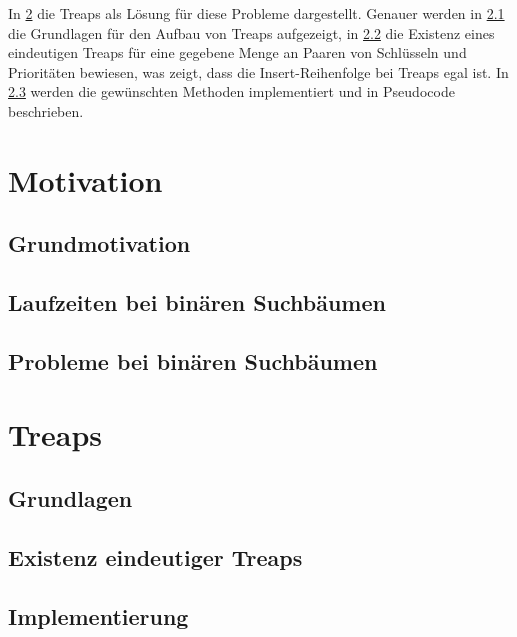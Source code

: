 \documentclass[a4paper]{scrreprt}
\theoremstyle{definition}
\begin{document}
In \ref{sec:treaps} die Treaps als Lösung für diese Probleme dargestellt. Genauer werden in \ref{sec:treapsbasics} die Grundlagen für den Aufbau von Treaps aufgezeigt, in \ref{sec:uniquetreaps} die Existenz eines eindeutigen Treaps für eine gegebene Menge an Paaren von Schlüsseln und Prioritäten bewiesen, was zeigt, dass die Insert-Reihenfolge bei Treaps egal ist. In \ref{sec:implementing} werden die gewünschten Methoden implementiert und in Pseudocode beschrieben.


\chapter{Motivation}
\label{sec:motivation}

\section{Grundmotivation}
\label{sec:motivationbasics}

\section{Laufzeiten bei binären Suchbäumen}
\label{sec:binaryruntime}

\section{Probleme bei binären Suchbäumen}
\label{sec:binaryproblems}

\chapter{Treaps}
\label{sec:treaps}

\section{Grundlagen}
\label{sec:treapsbasics}

\section{Existenz eindeutiger Treaps}
\label{sec:uniquetreaps}

\section{Implementierung}
\label{sec:implementing}
\end{document}
